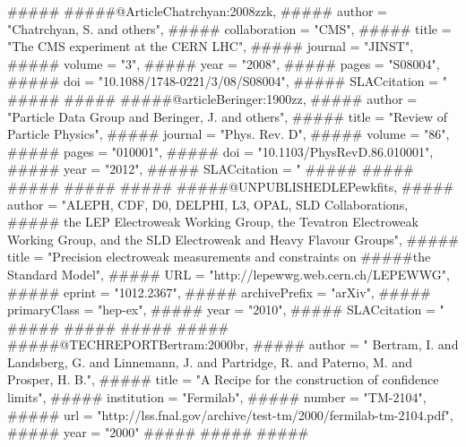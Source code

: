 #####%
#####@Article{Chatrchyan:2008zzk,
#####     author    = "Chatrchyan, S. and others",
#####     collaboration = "CMS",
#####     title     = "The {CMS} experiment at the {CERN} {LHC}",
#####     journal   = "JINST",
#####     volume    = "3",
#####     year      = "2008",
#####     pages     = "S08004",
#####     doi       = "10.1088/1748-0221/3/08/S08004",
#####     SLACcitation  = "%
#####}
#####%
#####@article{Beringer:1900zz,
#####      author         = "{Particle Data Group} and Beringer, J. and others",
#####      title          = "{Review of Particle Physics}",
#####      journal        = "Phys. Rev. D",
#####      volume         = "86",
#####      pages          = "010001",
#####      doi            = "10.1103/PhysRevD.86.010001",
#####      year           = "2012",
#####      SLACcitation   = "%
#####}
#####%
#####%
#####%
#####%
#####@UNPUBLISHED{LEPewkfits,
#####     author = "{ALEPH, CDF, D0, DELPHI, L3, OPAL, SLD Collaborations,
#####                                    the LEP Electroweak Working Group, the Tevatron Electroweak Working Group, and the SLD Electroweak and Heavy Flavour Groups}",
#####     title     = "Precision electroweak measurements and constraints on
#####the {Standard Model}",
#####     URL       = "http://lepewwg.web.cern.ch/LEPEWWG",
#####     eprint    = "1012.2367",
#####     archivePrefix = "arXiv",
#####     primaryClass  =  "hep-ex",
#####     year  = "2010",
#####     SLACcitation  = "%
#####}
#####%
#####%
#####%
#####@TECHREPORT{Bertram:2000br,
#####  author = " Bertram, I. and Landsberg, G. and Linnemann, J. and Partridge, R. and Paterno, M. and Prosper, H. B.",
#####  title =  "A Recipe for the construction of confidence limits",
#####  institution = "Fermilab",
#####  number     = "{TM-2104}",
#####  url = "http://lss.fnal.gov/archive/test-tm/2000/fermilab-tm-2104.pdf",
#####  year = "2000"
##### }
##### %
##### %

